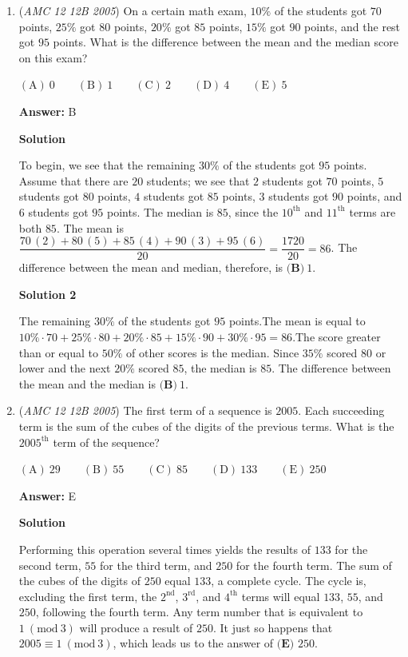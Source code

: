 \begin{enumerate}
	\item (\textit{AMC 12 12B 2005}) On a certain math exam, $10\%$ of the students got $70$ points, $25\%$ got $80$ points, $20\%$ got $85$ points, $15\%$ got $90$ points, and the rest got $95$ points.  What is the difference between the mean and the median score on this exam?


 $\mathrm{(A)}\ {{{0}}} \qquad \mathrm{(B)}\ {{{1}}} \qquad \mathrm{(C)}\ {{{2}}} \qquad \mathrm{(D)}\ {{{4}}} \qquad \mathrm{(E)}\ {{{5}}}$

 \textbf{Answer: }B



\textbf{Solution}

To begin, we see that the remaining $30\%$ of the students got $95$ points. Assume that there are $20$ students; we see that $2$ students got $70$ points, $5$ students got $80$ points, $4$ students got $85$ points, $3$ students got $90$ points, and $6$ students got $95$ points. The median is $85$, since the $10^{\text{th}}$ and $11^{\text{th}}$ terms are both $85$. The mean is $\dfrac{70\,(2)+80\,(5)+85\,(4)+90\,(3)+95\,(6)}{20}=\dfrac{1720}{20}=86$. The difference between the mean and median, therefore, is $\boxed{\textbf{(B)}\ 1}$.

 



\textbf{Solution 2}

The remaining $30\%$ of the students got $95$ points.The mean is equal to $10\%\cdot70 + 25\%\cdot80 + 20\%\cdot85 + 15\%\cdot90 + 30\%\cdot95 = 86$.The score greater than or equal to $50\%$ of other scores is the median. Since $35\%$ scored $80$ or lower and the next $20\%$ scored $85$, the median is $85$. The difference between the mean and the median is $\boxed{\textbf{(B)}\ 1}$.

 


	\item (\textit{AMC 12 12B 2005}) The first term of a sequence is $2005$. Each succeeding term is the sum of the cubes of the digits of the previous terms. What is the $2005^{\text{th}}$ term of the sequence?


 $\mathrm{(A)}\ {{{29}}} \qquad \mathrm{(B)}\ {{{55}}} \qquad \mathrm{(C)}\ {{{85}}} \qquad \mathrm{(D)}\ {{{133}}} \qquad \mathrm{(E)}\ {{{250}}}$

 \textbf{Answer: }E



\textbf{Solution}

Performing this operation several times yields the results of $133$ for the second term, $55$ for the third term, and $250$ for the fourth term. The sum of the cubes of the digits of $250$ equal $133$, a complete cycle. The cycle is, excluding the first term, the $2^{\text{nd}}$, $3^{\text{rd}}$, and $4^{\text{th}}$ terms will equal $133$, $55$, and $250$, following the fourth term. Any term number that is equivalent to $1\ (\text{mod}\ 3)$ will produce a result of $250$. It just so happens that $2005\equiv 1\ (\text{mod}\ 3)$, which leads us to the answer of $\boxed{\textbf{(E) } 250}$.


\end{enumerate}
